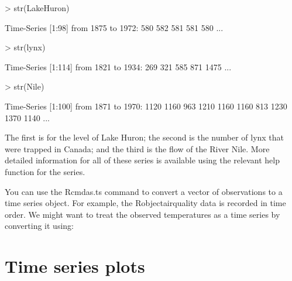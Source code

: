 \begin{Schunk}
\begin{Sinput}
> str(LakeHuron) 
\end{Sinput}
\begin{Soutput}
 Time-Series [1:98] from 1875 to 1972: 580 582 581 581 580 ...
\end{Soutput}
\begin{Sinput}
> str(lynx) 
\end{Sinput}
\begin{Soutput}
 Time-Series [1:114] from 1821 to 1934: 269 321 585 871 1475 ...
\end{Soutput}
\begin{Sinput}
> str(Nile) 
\end{Sinput}
\begin{Soutput}
 Time-Series [1:100] from 1871 to 1970: 1120 1160 963 1210 1160 1160 813 1230 1370 1140 ...
\end{Soutput}
\end{Schunk}

The first is for the level of Lake Huron; the second is the number of lynx that were trapped in Canada; and the third is the flow of the River Nile. More detailed information for all of these series is available using the relevant help function for the series. 
 
You can use the Rcmd{as.ts} command to convert a vector of observations to a time series object. For example, the Robject{airquality} data is recorded in time order. We might want to treat the observed temperatures as a time series by converting it using: 

\begin{Schunk}
\end{Schunk}

 
\section{Time series plots} 
 
